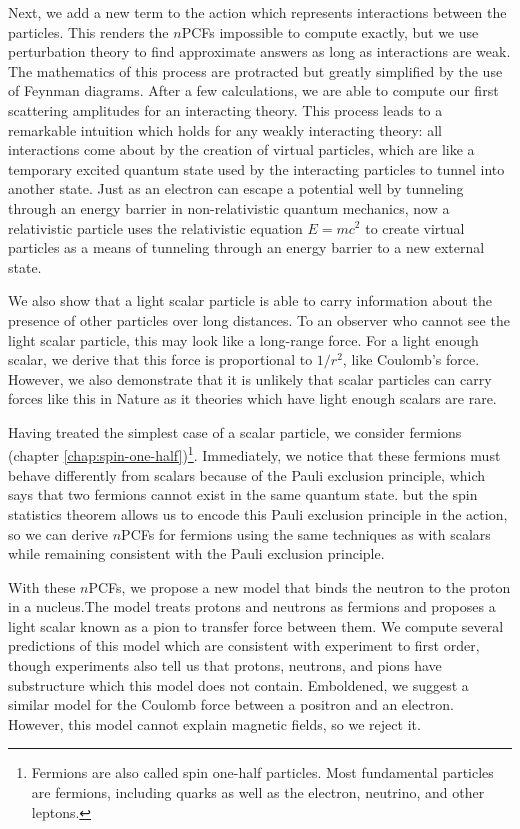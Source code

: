 Next, we add a new term to the action which represents interactions between the particles. This renders the $n$PCFs impossible to compute exactly, but we use perturbation theory to find approximate answers as long as interactions are weak. The mathematics of this process are protracted but greatly simplified by the use of Feynman diagrams. After a few calculations, we are able to compute our first scattering amplitudes for an interacting theory. This process leads to a remarkable intuition which holds for any weakly interacting theory: all interactions come about by the creation of virtual particles, which are like a temporary excited quantum state used by the interacting particles to tunnel into another state. Just as an electron can escape a potential well by tunneling through an energy barrier in non-relativistic quantum mechanics, now a relativistic particle uses the relativistic equation $E=mc^2$ to create virtual particles as a means of tunneling through an energy barrier to a new external state.

We also show that a light scalar particle is able to carry information about the presence of other particles over long distances. To an observer who cannot see the light scalar particle, this may look like a long-range force. For a light enough scalar, we derive that this force is proportional to $1/r^2$, like Coulomb's force. However, we also demonstrate that it is unlikely that scalar particles can carry forces like this in Nature as it theories which have light enough scalars are rare.

Having treated the simplest case of a scalar particle, we consider fermions (chapter \ref{chap:spin-one-half})\footnote{Fermions are also called spin one-half particles. Most fundamental particles are fermions, including quarks as well as the electron, neutrino, and other leptons.}. Immediately, we notice that these fermions must behave differently from scalars because of the Pauli exclusion principle, which says that two fermions cannot exist in the same quantum state. but the spin statistics theorem allows us to encode this Pauli exclusion principle in the action, so we can derive $n$PCFs for fermions using the same techniques as with scalars while remaining consistent with the Pauli exclusion principle.

With these $n$PCFs, we propose a new model that binds the neutron to the proton in a nucleus.The model treats protons and neutrons as fermions and proposes a light scalar known as a pion to transfer force between them. We compute several predictions of this model which are consistent with experiment to first order, though experiments also tell us that protons, neutrons, and pions have substructure which this model does not contain. Emboldened, we suggest a similar model for the Coulomb force between a positron and an electron. However, this model cannot explain magnetic fields, so we reject it. 

